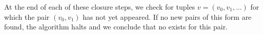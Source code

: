     At the end of each of these closure steps, we check for
    tuples $v = (v_0, v_1, \dots)$ for which the pair $(v_0, v_1)$ has not
    yet appeared.  If no new pairs of this form are found, the algorithm halts
    and we conclude that no \ldto exists for this pair.













  \begin{comment}
    First we show $s_0(a,b,b_0) \comr{\thetaab} a$. Recall, $\ell:=n^2-1$, and
    $s_0(x,y,z):= q_\ell(p_\ell(x,y,z), p_\ell(y,y,z), z)$, so
    \begin{align*}
      s_0(a,b,b)&= q_\ell(p_\ell(a,b,b), p_\ell(b,b,b), b);\\
      &= q_\ell(p_\ell(a,b,b), b, b);
    \end{align*}
    \underline{Claim 1}: If $0 < k < n^2$, then $a \comr{\thetaab} p_k(a, b, b)$.\\
    \emph{Proof:} Clearly $a \comr{\thetaab} p_1(a, b, b)$, since $p_1 \in \dtr (a, b, 0)$.
    Fix $k < n^2$ and assume $p_{k-1} \in \dtr (a, b, 0)$; that is,
    $a \comr{\thetao} p_{k-1}(a,b,b)$. Then
    $p_k(a,b,b) = q_{k-1}(p_{k-1}(a,b,b), b, b) \comr{\thetao}
      q_{k-1}(a, b, b)$.
    The latter is congruent to  $a$ modulo $\com{\thetaab}$, since
    $q_k\in \dtr \{(a,b, 0)\}$ for all $0< k < n^2$. This proves the claim, from which it follows that
    $s_0(a,b,b) \comr{\thetaab} q_\ell(a,b,b) \comr{\thetao} a$, as desired.

    Next, we show for $0 < k < n^2$ that $s_0(a_k, a_k, b_k) = b_k$.
    By definition
    \begin{equation*}
    s_0(a_k, a_k, b_k) = q_\ell(p_\ell(a_k,a_k,b_k), p_\ell(a_k,a_k,b_k), b_k).
    \end{equation*}
    \underline{Claim 2}: If $0 = k< j$ or $0 \leq k\leq j < n^2$, then $p_j(a_k, a_k, b_k) = b_k$.\\
      \emph{Proof:} By construction, $p_1 (a_0, a_0, b_0) = b_0$.  Fix $j$ and $k$ such that $0\leq k\leq j < n^2$.
      Assume $p_j(a_k, a_k, b_k) = b_k$. Then, since $q_j$ belongs to $\dtr (p_{j}(a_j, a_j, b_j),b_j, 1)$, we have
      \begin{align*}
        p_{j+1}(a_k, a_k, b_k) &=
        q_{j}(p_{j}(a_k, a_k, b_k), p_{j}(a_k, a_k, b_k), b_k)\\
        &=\begin{cases}
          q_{j}(b_k, b_k, b_k), & k<j\\
          b_k, & k=j
        \end{cases}\\
        &= b_k.
      \end{align*}
    Claim 2 is now proved, from which it follows that $s_0(a_k, a_k, b_k) = b_k$. This completes the proof of
    Lemma~\ref{lem:19}.
    \end{proof}


\end{comment}
